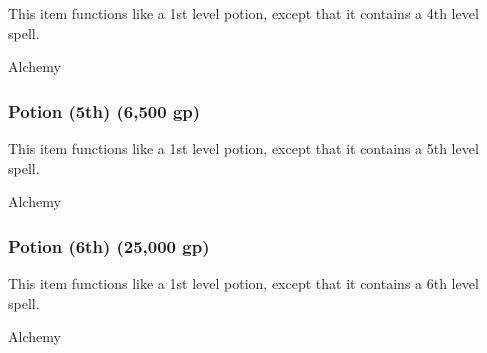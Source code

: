 This item functions like a 1st level potion, except that it contains a 4th level spell.



 Alchemy


\lowercase{\hypertarget{item:Potion (5th)}{}}\label{item:Potion (5th)}
\hypertarget{item:Potion (5th)}{\subsubsection{Potion (5th)\hfill{} (6,500 gp)}}

This item functions like a 1st level potion, except that it contains a 5th level spell.



 Alchemy


\lowercase{\hypertarget{item:Potion (6th)}{}}\label{item:Potion (6th)}
\hypertarget{item:Potion (6th)}{\subsubsection{Potion (6th)\hfill{} (25,000 gp)}}

This item functions like a 1st level potion, except that it contains a 6th level spell.



 Alchemy
